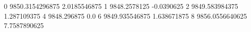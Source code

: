 0 9850.3154296875 2.0185546875
1 9848.2578125 -0.0390625
2 9849.583984375 1.287109375
4 9848.296875 0.0
6 9849.935546875 1.638671875
8 9856.0556640625 7.7587890625
